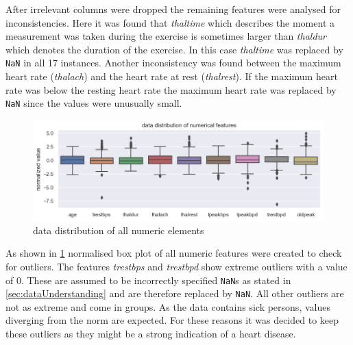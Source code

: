 After irrelevant columns were dropped the remaining features were analysed for inconsistencies. Here it was found that \textit{thaltime} which describes the moment a measurement was taken during the exercise is sometimes larger than \textit{thaldur} which denotes the duration of the exercise. In this case \textit{thaltime} was replaced by \texttt{NaN} in all 17 instances. Another inconsistency was found between the maximum heart rate (\textit{thalach}) and the heart rate at rest (\textit{thalrest}). If the maximum heart rate was below the resting heart rate the maximum heart rate was replaced by \texttt{NaN} since the values were unusually small.

\begin{figure}[h]
	\centering
	\includegraphics[width=\textwidth]{images/dataDistribution.png}
	\caption{data distribution of all numeric elements}
	\label{fig:dataDistribution}
\end{figure}
As shown in \cref{fig:dataDistribution}  normalised box plot of all numeric features were created to check for outliers. The features \textit{trestbps} and \textit{trestbpd} show extreme outliers with a value of 0. These are assumed to be incorrectly specified \texttt{NaN}s as stated in \cref{sec:dataUnderstanding} and are therefore replaced by \texttt{NaN}. All other outliers are not as extreme and come in groups. As the data contains sick persons, values diverging from the norm are expected. For these reasons it was decided to keep these outliers as they might be a strong indication of a heart disease.

